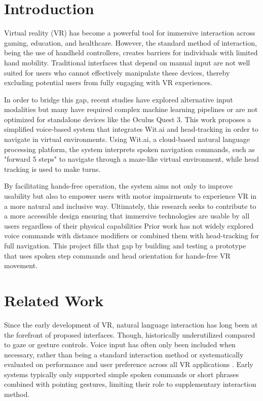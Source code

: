 \documentclass[manuscript, screen, review]{acmart}
\begin{document}
\maketitle

\section{Introduction}
Virtual reality (VR) has become a powerful tool for immersive interaction across gaming, education, and healthcare. However, the standard method of interaction, being the use of handheld controllers, creates barriers for individuals with limited hand mobility. Traditional interfaces that depend on manual input are not well suited for users who cannot effectively manipulate these devices, thereby excluding potential users from fully engaging with VR experiences. 

In order to bridge this gap, recent studies have explored alternative input modalities but many have required complex machine learning pipelines or are not optimized for standalone devices like the Oculus Quest 3. This work proposes a simplified voice-based system that integrates Wit.ai and head-tracking in order to navigate in virtual environments. Using Wit.ai, a cloud-based natural language processing platform, the system interprets spoken navigation commands, such as "forward 5 steps" to navigate through a maze-like virtual environment, while head tracking is used to make turns. 

By facilitating hands-free operation, the system aims not only to improve usability but also to empower users with motor impairments to experience VR in a more natural and inclusive way. Ultimately, this research seeks to contribute to a more accessible design ensuring that immersive technologies are usable by all users regardless of their physical capabilities Prior work has not widely explored voice commands with distance modifiers or combined them with head-tracking for full navigation. This project fills that gap by building and testing a prototype that uses spoken step commands and head orientation for hands-free VR movement.

\section{Related Work}
Since the early development of VR, natural language interaction has long been at the forefront of proposed interfaces. Though, historically underutilized compared to gaze or gesture controls. Voice input has often only been included when necessary, rather than being a standard interaction method or systematically evaluated on performance and user preference across all VR applications  \cite{a1}. Early systems typically only supported simple spoken commands or short phrases combined with pointing gestures, limiting their role to supplementary interaction method. 
\end{document}

